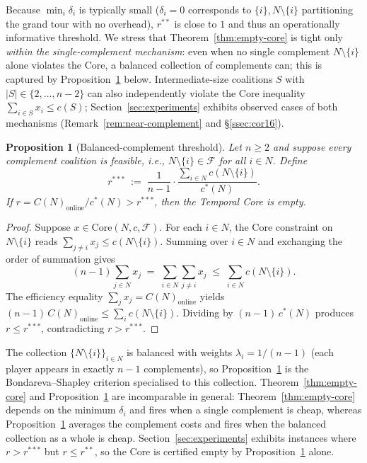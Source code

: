 \documentclass[11pt]{article}
\theoremstyle{plain}
\newtheorem{proposition}[theorem]{Proposition}
\theoremstyle{definition}
\theoremstyle{remark}
\newcommand{\F}{\mathcal{F}}
\newcommand{\cstar}{c^{\ast}}
\begin{document}
Because $\min_i \delta_i$ is typically small ($\delta_i=0$ corresponds to $\{i\},N\setminus\{i\}$ partitioning the grand tour with no overhead), $r^{\ast\ast}$ is close to $1$ and thus an operationally informative threshold. We stress that Theorem~\ref{thm:empty-core} is tight only \emph{within the single-complement mechanism}: even when no single complement $N\setminus\{i\}$ alone violates the Core, a balanced collection of complements can; this is captured by Proposition~\ref{prop:bondareva-complement} below. Intermediate-size coalitions $S$ with $|S|\in\{2,\ldots,n-2\}$ can also independently violate the Core inequality $\sum_{i\in S} x_i \le c(S)$; Section~\ref{sec:experiments} exhibits observed cases of both mechanisms (Remark~\ref{rem:near-complement} and \S\ref{ssec:cor16}).

\begin{proposition}[Balanced-complement threshold]
\label{prop:bondareva-complement}
Let $n\ge 2$ and suppose every complement coalition is feasible, i.e., $N\setminus\{i\}\in\F$ for all $i\in N$. Define
\[
r^{\ast\ast\ast} \;:=\; \frac{1}{n-1}\cdot\frac{\sum_{i\in N} c(N\setminus\{i\})}{\cstar(N)}.
\]
If $r = C(N)_{\text{online}}/\cstar(N) > r^{\ast\ast\ast}$, then the Temporal Core is empty.
\end{proposition}

\begin{proof}
Suppose $x\in\mathrm{Core}(N,c,\F)$. For each $i\in N$, the Core constraint on $N\setminus\{i\}$ reads $\sum_{j\ne i} x_j \le c(N\setminus\{i\})$. Summing over $i\in N$ and exchanging the order of summation gives
\[
(n-1)\sum_{j\in N} x_j \;=\; \sum_{i\in N}\sum_{j\ne i} x_j \;\le\; \sum_{i\in N} c(N\setminus\{i\}).
\]
The efficiency equality $\sum_j x_j = C(N)_{\text{online}}$ yields $(n-1)\,C(N)_{\text{online}} \le \sum_i c(N\setminus\{i\})$. Dividing by $(n-1)\,\cstar(N)$ produces $r \le r^{\ast\ast\ast}$, contradicting $r>r^{\ast\ast\ast}$.
\end{proof}

The collection $\{N\setminus\{i\}\}_{i\in N}$ is balanced with weights $\lambda_i = 1/(n-1)$ (each player appears in exactly $n-1$ complements), so Proposition~\ref{prop:bondareva-complement} is the Bondareva--Shapley criterion \citep{shapley1971core} specialised to this collection. Theorem~\ref{thm:empty-core} and Proposition~\ref{prop:bondareva-complement} are incomparable in general: Theorem~\ref{thm:empty-core} depends on the minimum $\delta_i$ and fires when a single complement is cheap, whereas Proposition~\ref{prop:bondareva-complement} averages the complement costs and fires when the balanced collection as a whole is cheap. Section~\ref{sec:experiments} exhibits instances where $r > r^{\ast\ast\ast}$ but $r\le r^{\ast\ast}$, so the Core is certified empty by Proposition~\ref{prop:bondareva-complement} alone.
\end{document}
